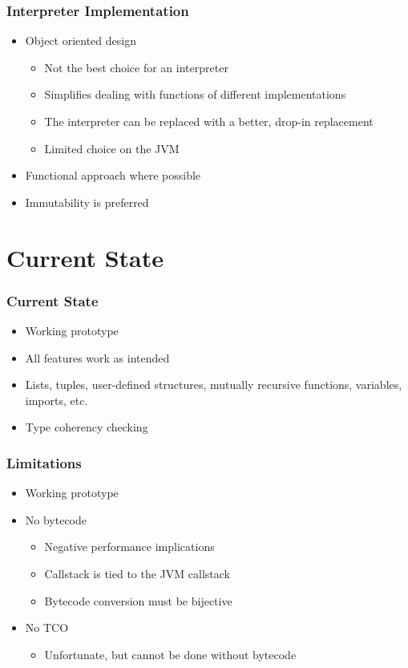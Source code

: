 \documentclass{beamer}
\begin{document}
\begin{frame}
    \frametitle{Interpreter Implementation}
    \begin{itemize}
        \item Object oriented design
            \begin{itemize}
                \item Not the best choice for an interpreter
                \item Simplifies dealing with functions of different implementations
                \item The interpreter can be replaced with a better, drop-in replacement
                \item Limited choice on the JVM
            \end{itemize}
        \item Functional approach where possible
        \item Immutability is preferred
    \end{itemize}
\end{frame}

\section{Current State}

\begin{frame}
    \frametitle{Current State}
    \begin{itemize}
        \item Working prototype
        \item All features work as intended
        \item Lists, tuples, user-defined structures, mutually recursive functions, variables,
            imports, etc.
        \item Type coherency checking
    \end{itemize}
\end{frame}

\begin{frame}
    \frametitle{Limitations}
    \begin{itemize}
        \item Working prototype
        \item No bytecode
            \begin{itemize}
                \item Negative performance implications
                \item Callstack is tied to the JVM callstack
                \item Bytecode conversion must be bijective
            \end{itemize}
        \item No TCO
            \begin{itemize}
                \item Unfortunate, but cannot be done without bytecode
            \end{itemize}
    \end{itemize}
\end{frame}
\end{document}
